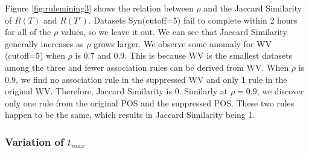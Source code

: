 Figure \ref{fig:rulemining3} shows the relation between $\rho$ and 
the Jaccard Similarity of $R(T)$ and $R(T')$. 
Datasets Syn(cutoff=5) fail to complete within 2 hours for all of the $\rho$
values, so we leave it out. 
We can see that Jaccard Similarity generally increases as $\rho$ grows larger. 
We observe some anomaly for WV (cutoff=5) when $\rho$ is 0.7 and 0.9. 
This is because WV is the smallest datasets
among the three and fewer association rules can be derived from WV.  
When $\rho$ is 0.9, we find no association rule in the suppressed WV
and only 1 rule in the original WV. Therefore, Jaccard Similarity is 0. 
Similarly at $\rho=0.9$, we discover only one rule from the original POS and the
suppressed POS. These two rules happen to be the same, which results in
Jaccard Similarity being 1.

\subsubsection{Variation of $t_{max}$}\label{sec:eval:timebound}

